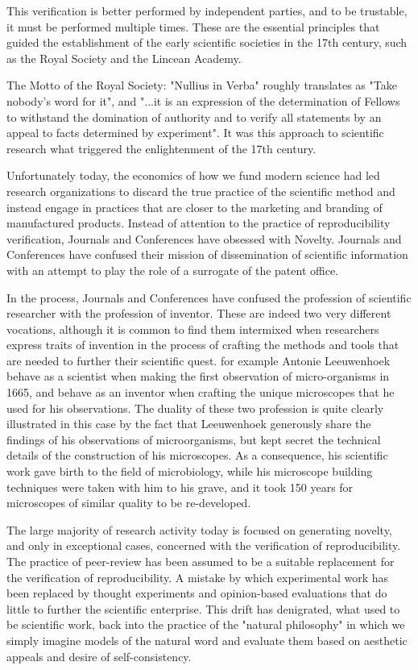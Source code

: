 \documentclass{frontiersENG} %
\begin{document}
This verification is better performed by independent parties, and to be
trustable, it must be performed multiple times. These are the essential
principles that guided the establishment of the early scientific societies in
the 17th century, such as the Royal Society and the Lincean Academy.

The Motto of the Royal Society:  "Nullius in Verba" roughly translates as "Take
nobody's word for it", and "...it is an expression of the determination of
Fellows to withstand the domination of authority and to verify all statements
by an appeal to facts determined by experiment". It was this approach to
scientific research what triggered the enlightenment of the 17th century.

Unfortunately today, the economics of how we fund modern science had led
research organizations to discard the true practice of the scientific method
and instead engage in practices that are closer to the marketing and branding
of manufactured products. Instead of attention to the practice of
reproducibility verification, Journals and Conferences have obsessed with
Novelty. Journals and Conferences have confused their mission of dissemination
of scientific information with an attempt to play the role of a surrogate of
the patent office.

In the process, Journals and Conferences have confused the profession of
scientific researcher with the profession of inventor. These are indeed two
very different vocations, although it is common to find them intermixed when
researchers express traits of invention in the process of crafting the methods
and tools that are needed to further their scientific quest. for example
Antonie Leeuwenhoek behave as a scientist when making the first observation of
micro-organisms in 1665, and behave as an inventor when crafting the unique
microscopes that he used for his observations. The duality of these two
profession is quite clearly illustrated in this case by the fact that
Leeuwenhoek generously share the findings of his observations of
microorganisms, but kept secret the technical details of the construction of
his microscopes. As a consequence, his scientific work gave birth to the field
of microbiology, while his microscope building techniques were taken with him
to his grave, and it took 150 years for microscopes of similar quality to be
re-developed.

The large majority of research activity today is focused on generating novelty,
and only in exceptional cases, concerned with the verification of
reproducibility. The practice of peer-review has been assumed to be a suitable
replacement for the verification of reproducibility. A mistake by which
experimental work has been replaced by thought experiments and opinion-based
evaluations that do little to further the scientific enterprise. This drift has
denigrated, what used to be scientific work, back into the practice of the
"natural philosophy" in which we simply imagine models of the natural word and
evaluate them based on aesthetic appeals and desire of self-consistency.
\end{document}
